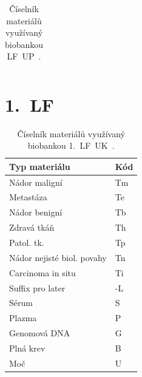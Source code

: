 \documentclass[11pt, final, oneside]{fithesis2}
\begin{document}
\begin{appendix}
\begin{table}[h!]
\begin{tabular}{l l}
\hline %
\end{tabular} 
\caption{Číselník materiálů využívaný biobankou LF~UP~\cite{ARCH_2014_1_25}.}
\label{tab:ciselnik-mat-LFUP} %
\end{table} 

\newpage

\section{1.~LF}

\begin{table}[h!] 
\centering
\begin{tabular}{l l}
\hline 
Typ materiálu & Kód \\
\hline \hline
Nádor maligní 							& Tm 	\\
Metastáza 									& Te 	\\
Nádor benigní 							& Tb 	\\
Zdravá tkáň 								& Th 	\\
Patol. tk. 									& Tp 	\\
Nádor nejisté biol. povahy 	& Tn 	\\
Carcinoma in situ 					& Ti 	\\
Suffix pro later 						& -L 	\\
Sérum 											& S~	\\
Plazma 											& P 	\\
Genomová DNA 								& G 	\\
Plná krev 									& B 	\\
Moč 												& U~	\\

\hline %
\end{tabular} 
\caption{Číselník materiálů využívaný biobankou 1.~LF~UK~\cite{ARCH_2014_1_25}.}
\label{tab:ciselnik-mat-Ilfuk} %
\end{table} 

\end{appendix}


\end{document}
